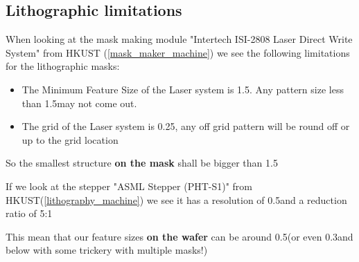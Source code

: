 \subsection{Lithographic limitations}
When looking at the mask making module "Intertech ISI-2808 Laser Direct Write System" from HKUST (\autoref{mask_maker_machine}) we see the following limitations for the lithographic masks:
\begin{itemize}
	\item The Minimum Feature Size of the Laser system is 1.5\um. Any pattern size less than 1.5\um may not come out.
	\item The grid of the Laser system is 0.25\um, any off grid pattern will be round off or up to the grid location
\end{itemize}

So the smallest structure \textbf{on the mask} shall be bigger than 1.5\um

If we look at the stepper "ASML Stepper (PHT-S1)" from HKUST(\autoref{lithography_machine}) we see it has a resolution of 0.5\um and a reduction ratio of 5:1

This mean that our feature sizes \textbf{on the wafer} can be around 0.5\um (or even 0.3\um and below with some trickery with multiple masks!)
